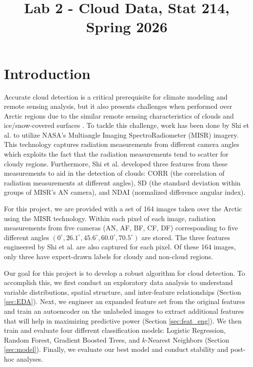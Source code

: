 \documentclass[11pt,letterpaper]{article}
\title{Lab 2 - Cloud Data, Stat 214, Spring 2026\vspace{-2em}}
\begin{document}
\maketitle

\section{Introduction}
\label{sec:intro}

Accurate cloud detection is a critical prerequisite for climate modeling and remote sensing analysis, but it also presents challenges when performed over Arctic regions due to the similar remote sensing characteristics of clouds and ice/snow-covered surfaces \cite{Shi}. To tackle this challenge, work has been done by Shi et al. to utilize NASA's Multiangle Imaging SpectroRadiometer (MISR) imagery. This technology captures radiation measurements from different camera angles which exploits the fact that the radiation measurements tend to scatter for cloudy regions. Furthermore, Shi et al. developed three features from these measurements to aid in the detection of clouds: CORR (the correlation of radiation measurements at different angles), SD (the standard deviation within groups of MISR's AN camera), and NDAI (normalized difference angular index).

For this project, we are provided with a set of 164 images taken over the Arctic using the MISR technology. Within each pixel of each image, radiation measurements from five cameras (AN, AF, BF, CF, DF) corresponding to five different angles $(0^{\circ}, 26.1^{\circ}, 45.6^{\circ}, 60.0^{\circ}, 70.5^{\circ})$ are stored. The three features engineered by Shi et al. are also captured for each pixel. Of these 164 images, only three have expert-drawn labels for cloudy and non-cloud regions.

Our goal for this project is to develop a robust algorithm for cloud detection. To accomplish this, we first conduct an exploratory data analysis to understand variable distributions, spatial structure, and inter-feature relationships (Section \ref{sec:EDA}). Next, we engineer an expanded feature set from the original features and train an autoencoder on the unlabeled images to extract additional features that will help in maximizing predictive power (Section \ref{sec:feat_eng}). We then train and evaluate four different classification models: Logistic Regression, Random Forest, Gradient Boosted Trees, and $k$-Nearest Neighbors (Section \ref{sec:model}). Finally, we evaluate our best model and conduct stability and post-hoc analyses.
\end{document}
